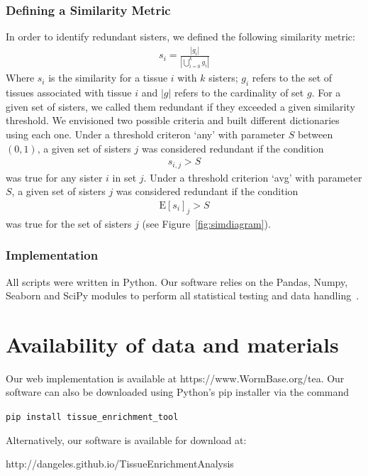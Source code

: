 \documentclass{bmcart}
\begin{document}
\subsubsection*{Defining a Similarity Metric}
In order to identify redundant sisters, we defined the following similarity metric:
\begin{eqnarray}\label{similarity def}
	s_i = \frac{|g_i|}{|\bigcup_{i= 0}^k g_i|}
\end{eqnarray}
Where $s_i$ is the similarity for a tissue $i$ with $k$ sisters; $g_i$ refers to the set of tissues associated with tissue $i$ and $|g|$ refers to the cardinality of set $g$. For a given set of sisters, we called them redundant if they exceeded a given similarity threshold. We envisioned two possible criteria and built different dictionaries using each one. Under a threshold criteron `any' with parameter $S$ between $(0, 1)$, a given set of sisters $j$ was considered redundant if the condition
\begin{eqnarray}\label{any threshold}
	s_{i, j} > S
\end{eqnarray}
was true for any sister $i$ in set $j$. Under a threshold criterion `avg' with parameter $S$, a given set of sisters $j$ was considered redundant if the condition
\begin{eqnarray}\label{avg threshold}
	\mathrm{E}[s_i]_j > S
\end{eqnarray}
was true for the set of sisters $j$ (see Figure~\ref{fig:simdiagram}).

\subsubsection*{Implementation}
All scripts were written in Python. Our software relies on the Pandas, Numpy, Seaborn and SciPy modules to perform all statistical testing and data handling~\cite{McKinney2011, VanDerWalt2011, Oliphant2007}.


\section*{Availability of data and materials}
Our web implementation is available at https://www.WormBase.org/tea. Our software can also be downloaded using Python's pip installer via the command

\texttt{pip install tissue\_enrichment\_tool}

Alternatively, our software is available for download at:

http://dangeles.github.io/TissueEnrichmentAnalysis
\end{document}
